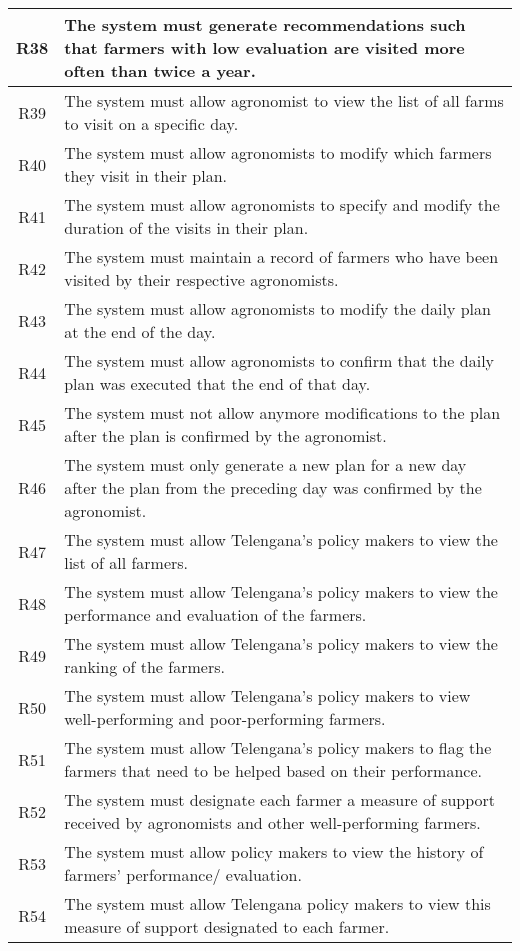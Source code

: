 \begin{longtable}{|c|>{\raggedright\arraybackslash}m{15cm}|}
R38	& The system must generate recommendations such that farmers with low evaluation are visited more often than twice a year.\\\hline
R39	& The system must allow agronomist to view the list of all farms to visit on a specific day.\\\hline
R40	& The system must allow agronomists to modify which farmers they visit in their plan.\\\hline
R41	& The system must allow agronomists to specify and modify the duration of the visits in their plan.\\\hline
R42	& The system must maintain a record of farmers who have been visited by their respective agronomists.\\\hline
R43	& The system must allow agronomists to modify the daily plan at the end of the day.\\\hline
R44	& The system must allow agronomists to confirm that the daily plan was executed that the end of that day.\\\hline
R45	& The system must not allow anymore modifications to the plan after the plan is confirmed by the agronomist.\\\hline
R46	& The system must only generate a new plan for a new day after the plan from the preceding day was confirmed by the agronomist.\\\hline
R47	& The system must allow Telengana’s policy makers to view the list of all farmers.\\\hline
R48	& The system must allow Telengana’s policy makers to view the performance and evaluation of the farmers.\\\hline
R49	& The system must allow Telengana’s policy makers to view the ranking of the farmers.\\\hline
R50	& The system must allow Telengana’s policy makers to view well-performing and poor-performing farmers.\\\hline
R51	& The system must allow Telengana’s policy makers to flag the farmers that need to be helped based on their performance.\\\hline
R52	& The system must designate each farmer a measure of support received by agronomists and other well-performing farmers.\\\hline
R53	& The system must allow policy makers to view the history of farmers’ performance/ evaluation.\\\hline
R54	& The system must allow Telengana policy makers to view this measure of support designated to each farmer.\\\hline
\end{longtable}
